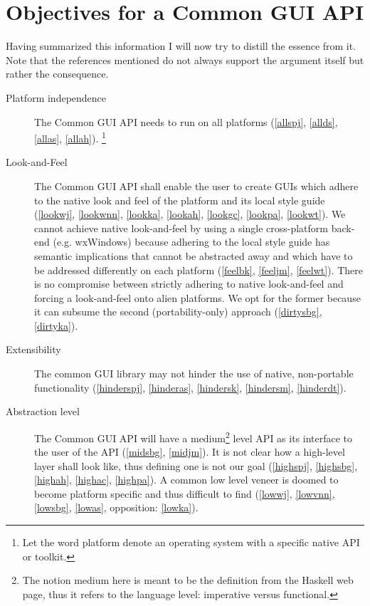 \documentclass{article}
\begin{document}
\section{Objectives for a Common GUI API}

Having summarized this information I will now try to distill the
essence from it. Note that the references mentioned do not always
support the argument itself but rather the consequence.

\begin{description}
\item[Platform independence] The Common GUI API needs to run on all
  platforms (\ref{allspj}, \ref{allds}, \ref{allas}, \ref{allah}).
  \footnote{Let the word platform denote an operating system with a
    specific native API or toolkit.}
\item[Look-and-Feel] The Common GUI API shall enable the user to
  create GUIs which adhere to the native look and feel of the platform
  and its local style guide (\ref{lookwj}, \ref{lookwnn},
  \ref{lookka}, \ref{lookah}, \ref{lookgc}, \ref{lookpa},
  \ref{lookwt}). We cannot achieve native look-and-feel by using a
  single cross-platform back-end (e.g. wxWindows) because adhering to
  the local style guide has semantic implications that cannot be
  abstracted away and which have to be addressed differently on each
  platform (\ref{feelbk}, \ref{feeljm}, \ref{feelwt}). There is no
  compromise between strictly adhering to native look-and-feel and
  forcing a look-and-feel onto alien platforms.  We opt for the former
  because it can subsume the second (portability-only) approach
  (\ref{dirtysbg}, \ref{dirtyka}).
\item[Extensibility] The common GUI library may not hinder the use of
  native, non-portable functionality (\ref{hinderspj}, \ref{hinderas},
  \ref{hindersk}, \ref{hindersm}, \ref{hinderdt}).
\item[Abstraction level] The Common GUI API will have a
  medium\footnote{The notion medium here is meant to be the definition
    from the Haskell web page, thus it refers to the language level:
    imperative versus functional.}  level API as its interface to the
  user of the API (\ref{midsbg}, \ref{midjm}).  It is not clear how a
  high-level layer shall look like, thus defining one is not our goal
  (\ref{highspj}, \ref{highsbg}, \ref{highah}, \ref{highac},
  \ref{highpa}). A common low level veneer is doomed to become
  platform specific and thus difficult to find (\ref{lowwj},
  \ref{lowvnn}, \ref{lowsbg}, \ref{lowas}, opposition: \ref{lowka}).

\end{description}
\end{document}
